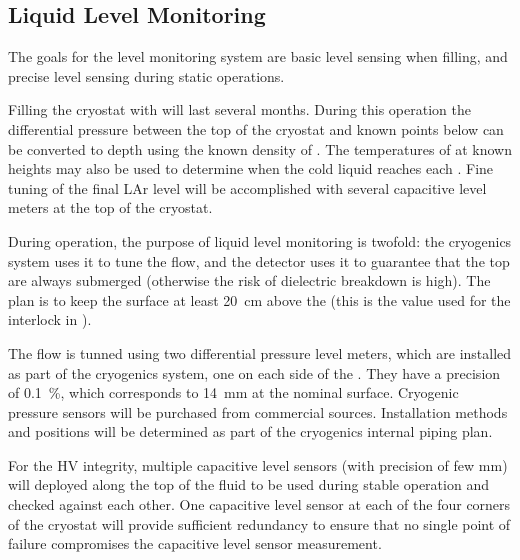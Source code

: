 \subsection{Liquid Level Monitoring}

The goals for the \lar level monitoring system are basic level sensing when filling, and precise level sensing during static operations. 

Filling the cryostat with \lar will last several months. During this operation 
the differential pressure between the top of
the cryostat and known points below can be converted to depth using
the known density of \lar.  The temperatures of  at known
heights may also be used to determine when the cold liquid reaches 
each . Fine tuning of the final LAr level will be accomplished 
with several capacitive level meters at the top of the cryostat. 

During operation, the purpose of liquid level monitoring is twofold:
the cryogenics system uses it to tune the \lar flow, and 
the detector uses it to guarantee that the top  are always
submerged (otherwise the risk of dielectric breakdown is high). The plan is to keep the \lar surface at least \SI{20}{cm} above the  (this is the value used for the  interlock in ). 

The \lar flow 
is tunned using two differential pressure level meters, which are installed as part of the cryogenics system, one on each side of the .  They 
have a precision of \SI{0.1}{\%}, which corresponds to \SI{14}{mm} at the
nominal \lar surface. Cryogenic pressure sensors will be purchased from commercial sources. Installation methods and positions will be determined as part of the
cryogenics internal piping plan.  


For the HV integrity, multiple capacitive level sensors (with precision of few mm) will deployed along the top of the fluid to be used during stable operation and checked against each other.
One capacitive level sensor at each of the four corners of the cryostat will provide sufficient redundancy to ensure that no single point of failure compromises the capacitive level sensor measurement.


